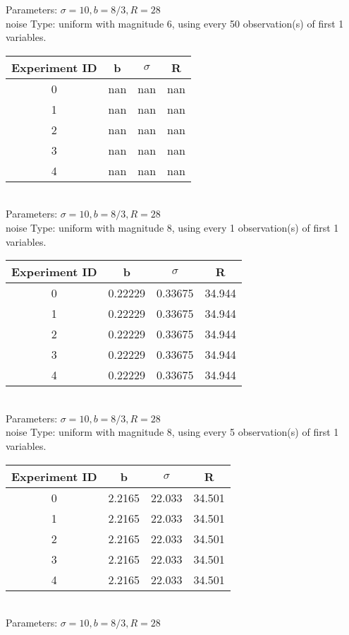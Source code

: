 \begin{multicols}{3}
Parameters: $\sigma=10, b=8/3, R=28$\\
noise Type: uniform with magnitude 6, using every 50 observation(s) of first 1 variables.\\
\begin{tabular}{cccc}
\hline Experiment ID & b & $\sigma$ & R \\ \hline 
0 & nan & nan & nan\\ \hline 
 1 & nan & nan & nan\\ \hline 
 2 & nan & nan & nan\\ \hline 
 3 & nan & nan & nan\\ \hline 
 4 & nan & nan & nan\\ \hline 
 \end{tabular}\\
Parameters: $\sigma=10, b=8/3, R=28$\\
noise Type: uniform with magnitude 8, using every 1 observation(s) of first 1 variables.\\
\begin{tabular}{cccc}
\hline Experiment ID & b & $\sigma$ & R \\ \hline 
0 & 0.22229 & 0.33675 & 34.944\\ \hline 
 1 & 0.22229 & 0.33675 & 34.944\\ \hline 
 2 & 0.22229 & 0.33675 & 34.944\\ \hline 
 3 & 0.22229 & 0.33675 & 34.944\\ \hline 
 4 & 0.22229 & 0.33675 & 34.944\\ \hline 
 \end{tabular}\\
Parameters: $\sigma=10, b=8/3, R=28$\\
noise Type: uniform with magnitude 8, using every 5 observation(s) of first 1 variables.\\
\begin{tabular}{cccc}
\hline Experiment ID & b & $\sigma$ & R \\ \hline 
0 & 2.2165 & 22.033 & 34.501\\ \hline 
 1 & 2.2165 & 22.033 & 34.501\\ \hline 
 2 & 2.2165 & 22.033 & 34.501\\ \hline 
 3 & 2.2165 & 22.033 & 34.501\\ \hline 
 4 & 2.2165 & 22.033 & 34.501\\ \hline 
 \end{tabular}\\
Parameters: $\sigma=10, b=8/3, R=28$\\

\end{multicols}
